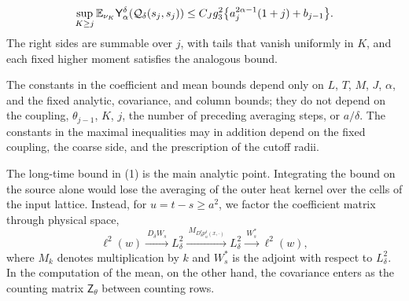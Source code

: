 \begin{theorem}
\begin{enumerate}
\[
 \sup_{K\ge j}\mathbb E_{\nu_K}\mathsf Y_{\alpha}^{\delta}(\mathcal Q_\delta(s_j,s_j))\le C_Jg_3^2\bigl\{a_j^{2\alpha-1}(1+j)+b_{j-1}\bigr\}.
\]
The right sides are summable over $j$, with tails that vanish uniformly in $K$, and each fixed higher moment satisfies the analogous bound.
\end{enumerate}
The constants in the coefficient and mean bounds depend only on $L$, $T$, $M$, $J$, $\alpha$, and the fixed analytic, covariance, and column bounds; they do not depend on the coupling, $\theta_{j-1}$, $K$, $j$, the number of preceding averaging steps, or $a/\delta$. The constants in the maximal inequalities may in addition depend on the fixed coupling, the coarse side, and the prescription of the cutoff radii.
\end{theorem}

The long-time bound in (1) is the main analytic point. Integrating the bound on the source alone would lose the averaging of the outer heat kernel over the cells of the input lattice. Instead, for $u=t-s\ge a^2$, we factor the coefficient matrix through physical space,
\[
 \ell^2(w)\xrightarrow{\ D_\delta W_s\ }L^2_\delta\xrightarrow{\ M_{D_\delta^rp_u^\delta(x,\cdot)}\ }L^2_\delta\xrightarrow{\ W_s^*\ }\ell^2(w),
\]
where $M_k$ denotes multiplication by $k$ and $W_s^*$ is the adjoint with respect to $L^2_\delta$. In the computation of the mean, on the other hand, the covariance enters as the counting matrix $\mathsf Z_\theta$ between counting rows.

